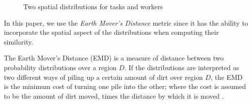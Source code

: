 \begin{figure}[t]
    \centering
    \vspace{-0.1in}
    \caption{Two spatial distributions for tasks and workers}
    \label{fig:sdist}
\end{figure}

In this paper, we use the \textit{Earth Mover's Distance} metric since it has the ability to incorporate the spatial aspect of the distributions when computing their similarity.

\begin{definition}
The Earth Mover's Distance (EMD) is a measure of distance between two probability distributions over a region $D$. If the distributions are interpreted as two different ways of piling up a certain amount of dirt over region $D$, the EMD is the minimum cost of turning one pile into the other; where the cost is assumed to be the amount of dirt moved, times the distance by which it is moved \cite{Rubner98}.
\end{definition}

